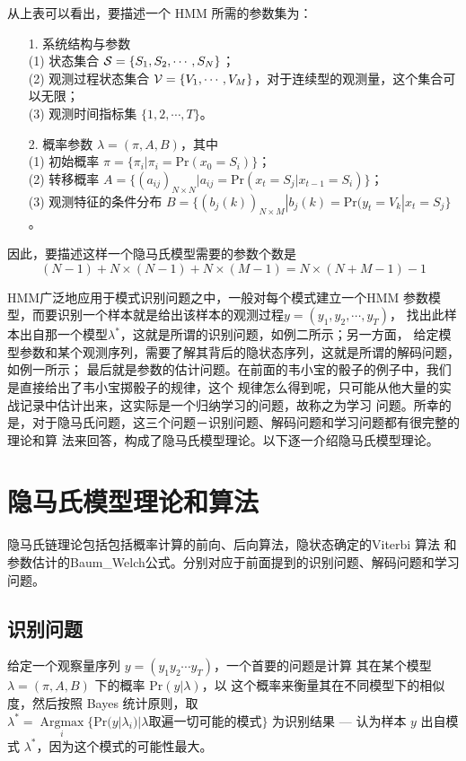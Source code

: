 从上表可以看出，要描述一个 HMM 所需的参数集为：
\begin{enumerate}
   \item[1.]   系统结构与参数 \\
        (1)   状态集合 \quad ${\cal S}=\{S_{1},S_{2}, \cdots, S_{N} \}$； \\
        (2)   观测过程状态集合 \quad ${\cal V}=\{V_{1},\cdots,V_{M}\}$，对于连续型的观测量，这个集合可以无限； \\
        (3)    观测时间指标集 \quad $\{1,2,\cdots,T\}$。 \\
   \item[2.]   概率参数 \quad $\lambda=(\pi,A,B)$，其中 \\
        (1)   初始概率 \quad $\pi=\{ \pi_{i}| \pi_{i}=\mbox{Pr}(x_{0}=S_{i})\}$； \\
        (2)   转移概率 \quad $A=\{ (a_{ij})_{N\times N}| a_{ij}=\mbox{Pr}(x_{t}=S_{j}|x_{t-1}=S_{i}) \}$； \\
        (3)   观测特征的条件分布 \quad $B=\{ (b_{j}(k))_{N \times M} |  b_{j}(k)=\mbox{Pr}(y_{t}=V_{k}|x_{t}=S_{j} \}$。
\end{enumerate}
因此，要描述这样一个隐马氏模型需要的参数个数是
$$
(N-1)+N\times (N-1)+ N \times (M-1)=N \times (N+M-1)-1
$$

HMM广泛地应用于模式识别问题之中，一般对每个模式建立一个HMM
参数模型，而要识别一个样本就是给出该样本的观测过程$y=(y_{1},y_{2},\cdots,y_{T})$，
找出此样本出自那一个模型$\lambda^{\ast}$，这就是所谓的识别问题，如例二所示；另一方面，
给定模型参数和某个观测序列，需要了解其背后的隐状态序列，这就是所谓的解码问题，如例一所示；
最后就是参数的估计问题。在前面的韦小宝的骰子的例子中，我们是直接给出了韦小宝掷骰子的规律，这个
规律怎么得到呢，只可能从他大量的实战记录中估计出来，这实际是一个归纳学习的问题，故称之为学习
问题。所幸的是，对于隐马氏问题，这三个问题－识别问题、解码问题和学习问题都有很完整的理论和算
法来回答，构成了隐马氏模型理论。以下逐一介绍隐马氏模型理论。

\section{隐马氏模型理论和算法}

隐马氏链理论包括包括概率计算的前向、后向算法，隐状态确定的Viterbi 算法
和参数估计的Baum\_Welch公式。分别对应于前面提到的识别问题、解码问题和学习问题。

\subsection{识别问题}
给定一个观察量序列 $y=(y_{1}y_{2}\cdots
y_{T})$，一个首要的问题是计算 其在某个模型 $\lambda=(\pi,A,B)$
下的概率 $\mbox{Pr}(y |\lambda)$，以
这个概率来衡量其在不同模型下的相似度，然后按照 Bayes 统计原则，取
 $
   \lambda^{\ast}=\mathop{\mbox{Argmax}}\limits_{i}
                 \{\mbox{Pr}( y| \lambda_{i}) | \lambda \mbox{取遍一切可能的模式}\}
$ 为识别结果 --- 认为样本 $y$ 出自模式
$\lambda^{\ast}$，因为这个模式的可能性最大。

